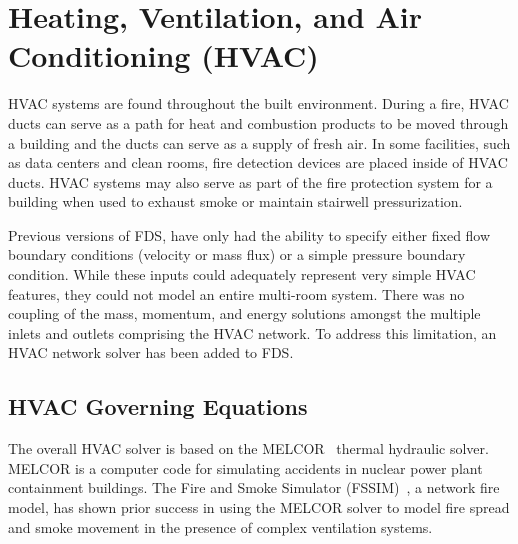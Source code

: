 \chapter{Heating, Ventilation, and Air Conditioning (HVAC)}

HVAC systems are found throughout the built environment.  During a fire, HVAC ducts can serve
as a path for heat and combustion products to be moved through a building and the ducts can serve as a supply of fresh air.  In some facilities, such as data centers and clean rooms, fire detection devices are placed inside of HVAC ducts.
HVAC systems may also serve as part of the fire protection system for a building when used to exhaust smoke or maintain stairwell pressurization.

Previous versions of FDS, have only had the ability to specify either fixed flow boundary conditions (velocity or mass flux) or a simple pressure boundary condition.
While these inputs could adequately represent very simple HVAC features, they could not model an entire multi-room system.
There was no coupling of the mass, momentum, and energy solutions amongst the multiple inlets and outlets comprising the HVAC network.
To address this limitation, an HVAC network solver has been added to FDS.


\section{HVAC Governing Equations}

The overall HVAC solver is based on the MELCOR~\cite{MELCOR} thermal hydraulic solver.  MELCOR is a computer code for simulating accidents in nuclear power plant containment buildings.
The Fire and Smoke Simulator (FSSIM)~\cite{FSSIM}, a network fire model, has shown prior success in using the MELCOR solver to model fire spread and smoke movement
in the presence of complex ventilation systems.

